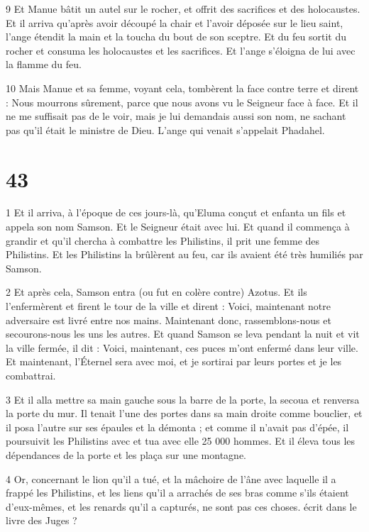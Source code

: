 \par 9 Et Manue bâtit un autel sur le rocher, et offrit des sacrifices et des holocaustes. Et il arriva qu'après avoir découpé la chair et l'avoir déposée sur le lieu saint, l'ange étendit la main et la toucha du bout de son sceptre. Et du feu sortit du rocher et consuma les holocaustes et les sacrifices. Et l'ange s'éloigna de lui avec la flamme du feu.

\par 10 Mais Manue et sa femme, voyant cela, tombèrent la face contre terre et dirent : Nous mourrons sûrement, parce que nous avons vu le Seigneur face à face. Et il ne me suffisait pas de le voir, mais je lui demandais aussi son nom, ne sachant pas qu'il était le ministre de Dieu. L'ange qui venait s'appelait Phadahel.



\chapter{43}

\par 1 Et il arriva, à l'époque de ces jours-là, qu'Eluma conçut et enfanta un fils et appela son nom Samson. Et le Seigneur était avec lui. Et quand il commença à grandir et qu'il chercha à combattre les Philistins, il prit une femme des Philistins. Et les Philistins la brûlèrent au feu, car ils avaient été très humiliés par Samson.

\par 2 Et après cela, Samson entra (ou fut en colère contre) Azotus. Et ils l'enfermèrent et firent le tour de la ville et dirent : Voici, maintenant notre adversaire est livré entre nos mains. Maintenant donc, rassemblons-nous et secourons-nous les uns les autres. Et quand Samson se leva pendant la nuit et vit la ville fermée, il dit : Voici, maintenant, ces puces m'ont enfermé dans leur ville. Et maintenant, l'Éternel sera avec moi, et je sortirai par leurs portes et je les combattrai.

\par 3 Et il alla mettre sa main gauche sous la barre de la porte, la secoua et renversa la porte du mur. Il tenait l'une des portes dans sa main droite comme bouclier, et il posa l'autre sur ses épaules et la démonta ; et comme il n'avait pas d'épée, il poursuivit les Philistins avec et tua avec elle 25 000 hommes. Et il éleva tous les dépendances de la porte et les plaça sur une montagne.

\par 4 Or, concernant le lion qu'il a tué, et la mâchoire de l'âne avec laquelle il a frappé les Philistins, et les liens qu'il a arrachés de ses bras comme s'ils étaient d'eux-mêmes, et les renards qu'il a capturés, ne sont pas ces choses. écrit dans le livre des Juges ?

